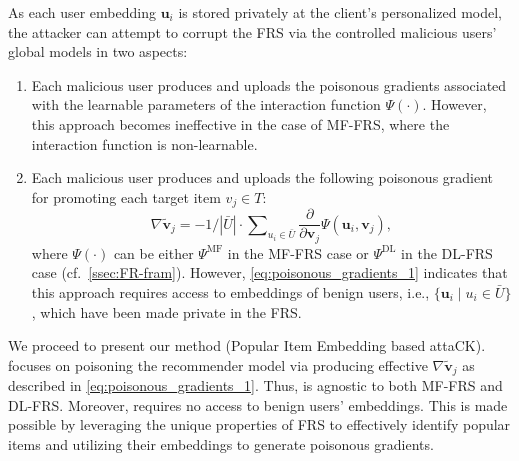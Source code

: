 As each user embedding $\mathbf{u}_i$ is stored privately at the client's personalized model, the attacker can attempt to corrupt the FRS via the controlled malicious users' global models in two aspects:
\begin{enumerate}[leftmargin=*]
\item Each malicious user produces and uploads the poisonous gradients associated with the learnable parameters of the interaction function $\Psi(\cdot)$.
However, this approach becomes ineffective in the case of MF-FRS, where the interaction function is non-learnable.

\item Each malicious user produces and uploads the following poisonous gradient for promoting each target item $v_j \in {T}$:
\begin{equation} \label{eq:poisonous_gradients_1}
\nabla\tilde{\mathbf{v}}_j = - 1/|\bar{{U}}| \cdot \sum\nolimits_{u_i\in\bar{{U}}}\frac{\partial}{\partial \mathbf{v}_j} \Psi(\mathbf{u}_i, \mathbf{v}_j),
\end{equation}
where $\Psi(\cdot)$ can be either $\Psi^\text{MF}$ in the MF-FRS case or $\Psi^\text{DL}$ in the DL-FRS case (cf.\ \cref{ssec:FR-fram}). 
However, \cref{eq:poisonous_gradients_1} indicates that this approach requires access to embeddings of benign users, i.e., $\{ \mathbf{u}_i \mid u_i\in\bar{{U}} \}$, which have been made private in the FRS.

\end{enumerate}

We proceed to present our method \model{} (Popular Item Embedding based attaCK).
\model{} focuses on poisoning the recommender model via producing effective $\nabla\tilde{\mathbf{v}}_j$ as described in \cref{eq:poisonous_gradients_1}. Thus, \model{} is agnostic to both MF-FRS and DL-FRS.
Moreover, \model{} requires no access to benign users' embeddings. This is made possible by leveraging the unique properties of FRS to effectively identify popular items and utilizing their embeddings to generate poisonous gradients.